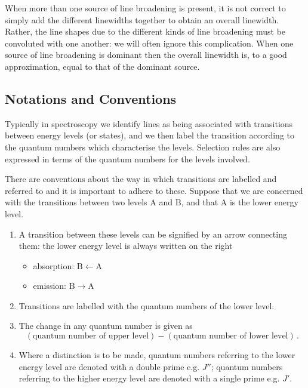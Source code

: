 \documentclass{article}
\theoremstyle{plain}\theoremheaderfont{\normalfont\itshape}\theorembodyfont{\rmfamily}\theoremseparator{.}\newtheorem*{rem}{Remark}\newtheorem*{ex}{Example}\newtheorem*{proof}{Proof}\newtheorem*{altp}{Alternative proof}
\theoremstyle{plain}\theoremheaderfont{\normalfont\bfseries}\theorembodyfont{\rmfamily}\theoremseparator{.}\newtheorem{thm}{Theorem}[section]\newtheorem{lem}[thm]{Lemma}\newtheorem{prop}[thm]{Proposition}\newtheorem*{cor}{Corollary}\newtheorem{defn}[thm]{Definition}\newtheorem{clm}[thm]{Claim}\newtheorem{clminproof}{Claim}\newtheorem{pos}{Postulate}[section]
\theoremstyle{break}\theoremheaderfont{\normalfont\itshape}\theorembodyfont{\rmfamily}\theoremseparator{.\medskip}\newtheorem*{proofskip}{Proof}\newtheorem*{exs}{Examples}\newtheorem*{rems}{Remarks}
\theoremstyle{break}\theoremheaderfont{\normalfont\bfseries}\theorembodyfont{\rmfamily}\theoremseparator{.\medskip}\newtheorem{lemskip}[thm]{Lemma}\newtheorem{defnskip}[thm]{Definition}\newtheorem{propskip}[thm]{Proposition}\newtheorem{thmskip}[thm]{Theorem}
\numberwithin{equation}{section}
\begin{document}
    When more than one source of line broadening is present, it is not correct to simply add the different linewidths together to obtain an overall linewidth. Rather, the line shapes due to the different kinds of line broadening must be convoluted with one another: we will often ignore this complication. When one source of line broadening is dominant then the overall linewidth is, to a good approximation, equal to that of the dominant source.
    \subsection{Notations and Conventions}
    Typically in spectroscopy we identify lines as being associated with transitions between energy levels (or states), and we then label the transition according to the quantum numbers which characterise the levels. Selection rules are also expressed in terms of the quantum numbers for the levels involved.
    
    There are conventions about the way in which transitions are labelled and referred to and it is important to adhere to these. Suppose that we are concerned with the transitions between two levels \(\mathrm{A}\) and \(\mathrm{B}\), and that \(\mathrm{A}\) is the lower energy level.

    \begin{enumerate}[topsep=0pt,label=(\roman*)]
        \item A transition between these levels can be signified by an arrow connecting them: the
        lower energy level is always written on the right
        \begin{itemize}[topsep=0pt]
            \item absorption: \(\mathrm{B\leftarrow A}\)
            \item emission: \(\mathrm{B\rightarrow A}\)
        \end{itemize}
        \item Transitions are labelled with the quantum numbers of the lower level.
        \item The change in any quantum number is given as
        \begin{equation}
            (\text{quantum number of upper level})-(\text{quantum number of lower level})\,.
        \end{equation}
        \item Where a distinction is to be made, quantum numbers referring to the lower energy level are denoted with a double prime e.g. \(J''\); quantum numbers referring to the higher energy level are denoted with a single prime e.g. \(J'\).   
    \end{enumerate}
\end{document}

